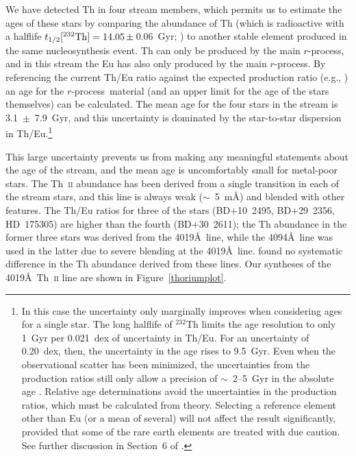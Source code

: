 \documentclass{emulateapj}
\def\rpro{\mbox{$r$-process}}
\begin{document}
We have detected Th in four stream members, which permits
us to estimate the ages of these stars by comparing the abundance of Th
(which is radioactive with a halflife
$t_{\rm 1/2} [^{232}{\rm Th}] = 14.05\,\pm\,$0.06~Gyr;
\citealt{audi03})
to another stable element produced in the same nucleosynthesis event.
Th can only be produced by the main \rpro,
and in this stream the Eu has also only produced by the main \rpro.
By referencing the current Th/Eu ratio against the expected production ratio
(e.g., \citealt{kratz07}) an age for the \rpro\ material (and an upper limit
for the age of the stars themselves) can be calculated.
The mean age for the four stars in the stream is 3.1~$\pm$~7.9~Gyr, and
this uncertainty is dominated by the star-to-star dispersion 
in Th/Eu.\footnote{
In this case the uncertainty only marginally improves when considering 
ages for a single star.
The long halflife of $^{232}$Th limits the age resolution to only 1~Gyr
per 0.021~dex of uncertainty in Th/Eu.
For an uncertainty of 0.20~dex, then, the uncertainty in the age
rises to 9.5~Gyr.
Even when the observational scatter has been minimized, 
the uncertainties from the production ratios still only allow a precision
of $\sim$~2--5~Gyr in the absolute age \citep{frebel07}.
Relative age determinations avoid the uncertainties in the production ratios,
which must be calculated from theory.
Selecting a reference element other than Eu (or a mean of several) will 
not affect the result significantly, provided that some of the rare earth
elements are treated with due caution.
See further discussion in Section~6 of \citet{roederer09b}.
}

This large uncertainty prevents us from making any meaningful
statements about the age of the stream, and the mean age is
uncomfortably small for metal-poor stars.
The Th~\textsc{ii} abundance has been derived from a single transition
in each of the stream stars, and this line is always weak ($\sim$~5~m\AA)
and blended with other features.  
The Th/Eu ratios for three of the stars (\mbox{BD$+$10~2495}, 
\mbox{BD$+$29~2356}, \mbox{HD~175305}) are higher than the fourth
(\mbox{BD$+$30~2611}); the Th abundance in the former three stars 
was derived from the 4019\AA\ line, while the 4094\AA\ line was used
in the latter due to severe blending at the 4019\AA\ line.
\citet{roederer09b} found no systematic difference in the Th abundance derived
from these lines.
Our syntheses of the 4019\AA\ Th~\textsc{ii} line are shown in 
Figure~\ref{thoriumplot}.
\end{document}
